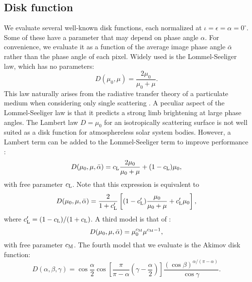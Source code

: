 \documentclass[3p,authoryear]{elsarticle}
\begin{document}
\subsection{Disk function}

We evaluate several well-known disk functions, each normalized at $\iota = \epsilon = \alpha = 0^\circ$. Some of these have a parameter that may depend on phase angle $\alpha$. For convenience, we evaluate it as a function of the average image phase angle $\bar{\alpha}$ rather than the phase angle of each pixel. Widely used is the Lommel-Seeliger law, which has no parameters:
\begin{equation}
D({\mu_0, \mu}) = \frac{2 \mu_0}{\mu_0 + \mu}.
\label{eq:L-S}
\end{equation}
This law naturally arises from the radiative transfer theory of a particulate medium when considering only single scattering \citep{H81}. A peculiar aspect of the Lommel-Seeliger law is that it predicts a strong limb brightening at large phase angles. The Lambert law $D = \mu_0$ for an isotropically scattering surface is not well suited as a disk function for atmosphereless solar system bodies. However, a Lambert term can be added to the Lommel-Seeliger term to improve performance \citep{BV83,McE91}:
\begin{equation}
D({\mu_0, \mu}, \bar{\alpha}) = c_{\rm L} \frac{2 \mu_0}{\mu_0 + \mu} + (1 - c_{\rm L}) \mu_0,
\label{eq:L-S+Lam_alt}
\end{equation}
with free parameter $c_{\rm L}$. Note that this expression is equivalent to
\begin{equation}
D({\mu_0, \mu}, \bar{\alpha}) = \frac{2}{1 + c_{\rm L}^\prime} \left[ (1-c_{\rm L}^\prime) \frac{\mu_0}{\mu_0 + \mu} + c_{\rm L}^\prime \mu_0 \right],
\label{eq:L-S+Lam}
\end{equation}
where $c_{\rm L}^\prime = (1 - c_{\rm L}) / (1 + c_{\rm L})$. A third model is that of \citet{M41}:
\begin{equation}
D({\mu_0, \mu, \bar{\alpha}}) = \mu_0^{c_{\rm M}} \mu^{{c_{\rm M}} - 1},
\label{eq:Minnaert}
\end{equation}
with free parameter $c_{\rm M}$. The fourth model that we evaluate is the Akimov disk function:
\begin{equation}
D({\alpha, \beta, \gamma}) = \cos \frac{\alpha}{2} \cos \left[ \frac{\pi}{\pi - \alpha} \left( \gamma - \frac{\alpha}{2} \right) \right] \frac{(\cos \beta)^{\alpha / (\pi - \alpha)}}{\cos \gamma}.
\label{eq:Akimov}
\end{equation}
\end{document}
